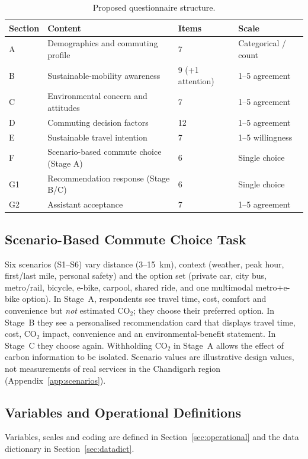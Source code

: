\documentclass[11pt,a4paper]{article}
\begin{document}
\begin{table}[H]
\centering
\small
\caption{Proposed questionnaire structure.}
\label{tab:instr}
\begin{tabular}{@{}llll@{}}
\toprule
\textbf{Section} & \textbf{Content} & \textbf{Items} & \textbf{Scale}\\
\midrule
A & Demographics and commuting profile & 7 & Categorical / count\\
B & Sustainable-mobility awareness & 9 (+1 attention) & 1--5 agreement\\
C & Environmental concern and attitudes & 7 & 1--5 agreement\\
D & Commuting decision factors & 12 & 1--5 agreement\\
E & Sustainable travel intention & 7 & 1--5 willingness\\
F & Scenario-based commute choice (Stage A) & 6 & Single choice\\
G1 & Recommendation response (Stage B/C) & 6 & Single choice\\
G2 & Assistant acceptance & 7 & 1--5 agreement\\
\bottomrule
\end{tabular}
\end{table}

\subsection{Scenario-Based Commute Choice Task}
Six scenarios (S1--S6) vary distance (3--15~km), context (weather, peak hour, first/last mile,
personal safety) and the option set (private car, city bus, metro/rail, bicycle, e-bike, carpool,
shared ride, and one multimodal metro$+$e-bike option). In Stage~A, respondents see travel time,
cost, comfort and convenience but \emph{not} estimated CO$_2$; they choose their preferred option. In
Stage~B they see a personalised recommendation card that displays travel time, cost, CO$_2$ impact,
convenience and an environmental-benefit statement. In Stage~C they choose again. Withholding CO$_2$
in Stage~A allows the effect of carbon information to be isolated. Scenario values are illustrative
design values, not measurements of real services in the Chandigarh region
(Appendix~\ref{app:scenarios}).

\subsection{Variables and Operational Definitions}
Variables, scales and coding are defined in Section~\ref{sec:operational} and the data dictionary in
Section~\ref{sec:datadict}.
\end{document}
